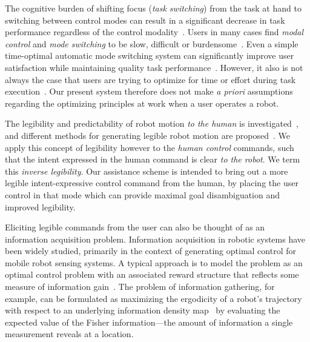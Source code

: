 \documentclass[conference]{IEEEtran}
\begin{document}
The cognitive burden of shifting focus (\textit{task switching}) from the task at hand to switching between control modes can result in a significant decrease in task performance regardless of the control modality~\cite{monsell2003task}. Users in many cases find \textit{modal control} and \textit{mode switching} to be slow, difficult or burdensome~\cite{herlant2016assistive}. Even a simple time-optimal automatic mode switching system can significantly improve user satisfaction while maintaining quality task performance~\cite{herlant2016assistive}. However, it also is not always the case that users are trying to optimize for time or effort during task execution~\cite{gopinath2017human}. Our present system therefore does not make \textit{a priori} assumptions regarding the optimizing principles at work when a user operates a robot.

The legibility and predictability of robot motion \textit{to the human} is investigated~\cite{dragan2013legibility}, and different methods for generating legible robot motion are proposed~\cite{holladay2014legible}. We apply this concept of legibility however to the \textit{human control} commands, such that the intent expressed in the human command is clear \textit{to the robot}. We term this \textit{inverse legibility}. Our assistance scheme is intended to bring out a more legible intent-expressive control command from the human, by placing the user control in that mode which can provide maximal goal disambiguation and improved legibility.

Eliciting legible commands from the user can also be thought of as an information acquisition problem. Information acquisition in robotic systems  have been widely studied, primarily in the context of generating optimal control for mobile robot sensing systems. A typical approach is to model the problem as an optimal control problem with an associated reward structure that reflects some measure of information gain~\cite{atanasov2014information}. The problem of information gathering, for example, can be formulated as maximizing the ergodicity of a robot's trajectory with respect to an underlying information density map~\cite{miller2013trajectory,miller2016ergodic} by evaluating the expected value of the Fisher information---the amount of information a single measurement reveals at a location. 
\end{document}
